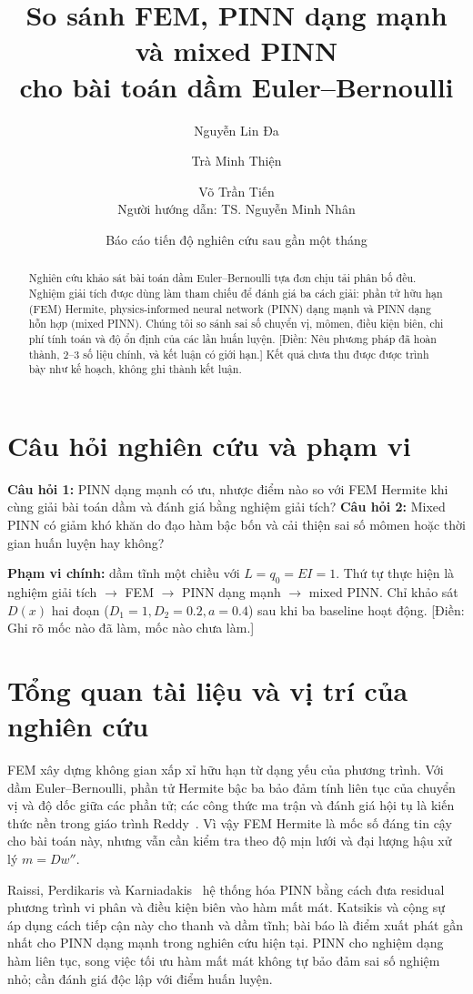 \documentclass[12pt,a4paper]{article}
\title{So sánh FEM, PINN dạng mạnh và mixed PINN\\cho bài toán dầm Euler--Bernoulli}
\author{Nguyễn Lin Đa \and Trà Minh Thiện \and Võ Trần Tiến\\[2mm]
  \small Người hướng dẫn: TS. Nguyễn Minh Nhân}
\date{Báo cáo tiến độ nghiên cứu sau gần một tháng}
\newcommand{\todo}[1]{\textcolor{red!70!black}{[Điền: #1]}}
\begin{document}
\maketitle
\begin{abstract}
\noindent
Nghiên cứu khảo sát bài toán dầm Euler--Bernoulli tựa đơn chịu tải phân bố đều. Nghiệm giải tích được dùng làm tham chiếu để đánh giá ba cách giải: phần tử hữu hạn (FEM) Hermite, physics-informed neural network (PINN) dạng mạnh và PINN dạng hỗn hợp (mixed PINN). Chúng tôi so sánh sai số chuyển vị, mômen, điều kiện biên, chi phí tính toán và độ ổn định của các lần huấn luyện. \todo{Nêu phương pháp đã hoàn thành, 2--3 số liệu chính, và kết luận có giới hạn.} Kết quả chưa thu được được trình bày như kế hoạch, không ghi thành kết luận.
\end{abstract}

\section{Câu hỏi nghiên cứu và phạm vi}
\textbf{Câu hỏi 1:} PINN dạng mạnh có ưu, nhược điểm nào so với FEM Hermite khi cùng giải bài toán dầm và đánh giá bằng nghiệm giải tích? \textbf{Câu hỏi 2:} Mixed PINN có giảm khó khăn do đạo hàm bậc bốn và cải thiện sai số mômen hoặc thời gian huấn luyện hay không?

\textbf{Phạm vi chính:} dầm tĩnh một chiều với $L=q_0=EI=1$. Thứ tự thực hiện là nghiệm giải tích $\rightarrow$ FEM $\rightarrow$ PINN dạng mạnh $\rightarrow$ mixed PINN. Chỉ khảo sát $D(x)$ hai đoạn ($D_1=1,D_2=0.2,a=0.4$) sau khi ba baseline hoạt động. \todo{Ghi rõ mốc nào đã làm, mốc nào chưa làm.}

\section{Tổng quan tài liệu và vị trí của nghiên cứu}
FEM xây dựng không gian xấp xỉ hữu hạn từ dạng yếu của phương trình. Với dầm Euler--Bernoulli, phần tử Hermite bậc ba bảo đảm tính liên tục của chuyển vị và độ dốc giữa các phần tử; các công thức ma trận và đánh giá hội tụ là kiến thức nền trong giáo trình Reddy~\cite{Reddy2019}. Vì vậy FEM Hermite là mốc số đáng tin cậy cho bài toán này, nhưng vẫn cần kiểm tra theo độ mịn lưới và đại lượng hậu xử lý $m=Dw''$.

Raissi, Perdikaris và Karniadakis~\cite{Raissi2019} hệ thống hóa PINN bằng cách đưa residual phương trình vi phân và điều kiện biên vào hàm mất mát. Katsikis và cộng sự~\cite{Katsikis2022} áp dụng cách tiếp cận này cho thanh và dầm tĩnh; bài báo là điểm xuất phát gần nhất cho PINN dạng mạnh trong nghiên cứu hiện tại. PINN cho nghiệm dạng hàm liên tục, song việc tối ưu hàm mất mát không tự bảo đảm sai số nghiệm nhỏ; cần đánh giá độc lập với điểm huấn luyện.
\end{document}
